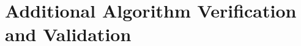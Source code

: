 \documentclass[class=report,11pt,crop=false]{standalone}
\begin{document}
\appendix
\chapter{Additional Algorithm Verification and Validation \label{apndxA}}

\end{document}
